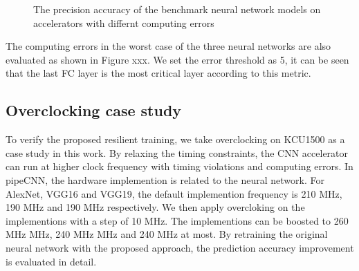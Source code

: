 \begin{figure}
        \center
        \qquad
        \qquad
        \caption{The precision accuracy of the benchmark neural network models on accelerators with differnt computing errors}
        \label{fig:softerror-accuracy}
\end{figure}

The computing errors in the worst case of the three neural networks are also evaluated as shown in 
Figure xxx. We set the error threshold as 5, it can be seen that the last FC layer is the most 
critical layer according to this metric. 

\subsection{Overclocking case study}
To verify the proposed resilient training, we take overclocking on KCU1500 as a case 
study in this work. By relaxing the timing constraints, the CNN accelerator can 
run at higher clock frequency with timing violations and computing errors. In pipeCNN, the 
hardware implemention is related to the neural network. For AlexNet, VGG16 and VGG19, the 
default implemention frequency is 210 MHz, 190 MHz and 190 MHz respectively. We then apply overcloking 
on the implementions with a step of 10 MHz. The implementions can be boosted to 
260 MHz MHz, 240 MHz MHz and 240 MHz at most. By retraining the original neural network with 
the proposed approach, the prediction accuracy improvement is evaluated in detail.

